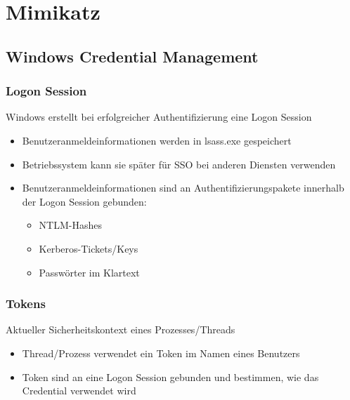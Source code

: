 


\section{Mimikatz}

\subsection{Windows Credential Management}

\subsubsection{Logon Session}
Windows erstellt bei erfolgreicher Authentifizierung eine Logon Session
\begin{itemize}
    \item Benutzeranmeldeinformationen werden in lsass.exe gespeichert
    \item Betriebssystem kann sie später für SSO bei anderen Diensten verwenden
    \item Benutzeranmeldeinformationen sind an Authentifizierungspakete innerhalb der Logon Session gebunden:
    \begin{itemize}
        \item NTLM-Hashes
        \item Kerberos-Tickets/Keys
        \item Passwörter im Klartext
    \end{itemize}
\end{itemize}

\subsubsection{Tokens}
Aktueller Sicherheitskontext eines Prozesses/Threads
\begin{itemize}
    \item Thread/Prozess verwendet ein Token im Namen eines Benutzers
    \item Token sind an eine Logon Session gebunden und bestimmen, wie das Credential verwendet wird
\end{itemize}

